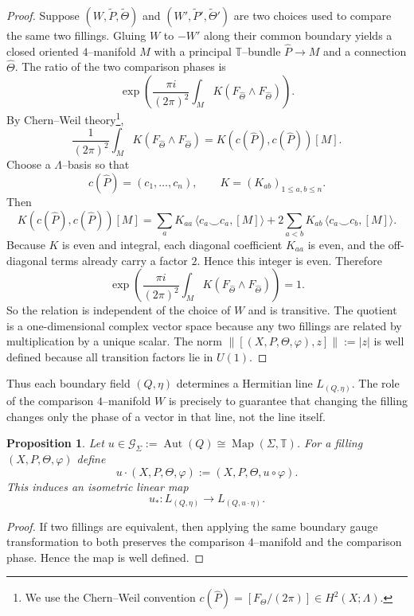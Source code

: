 \documentclass[12pt]{amsart}
\numberwithin{equation}{section}
\newtheorem{prop}[theorem]{Proposition}
\DeclareMathOperator{\Aut}{Aut}
\DeclareMathOperator{\Map}{Map}
\begin{document}
\begin{proof}
Suppose $(W,\widetilde P,\widetilde\Theta)$ and $(W',\widetilde P',\widetilde\Theta')$
are two choices used to compare the same two fillings.
Gluing $W$ to $-W'$ along their common boundary yields a closed oriented
$4$--manifold $M$ with a principal $\mathbb T$--bundle $\widehat P\to M$ and a
connection $\widehat\Theta$.
The ratio of the two comparison phases is
\[
\exp\!\left(
\frac{\pi i}{(2\pi)^2}
\int_M K(F_{\widehat\Theta}\wedge F_{\widehat\Theta})
\right).
\]
By Chern--Weil theory\footnote{We use the Chern--Weil convention \(c(\widehat P)=[F_\Theta/(2\pi)]\in H^2(X;\Lambda)\).},
\[
\frac{1}{(2\pi)^2}
\int_M K(F_{\widehat\Theta}\wedge F_{\widehat\Theta})
=
K(c(\widehat P),c(\widehat P))[M].
\]
Choose a $\Lambda$--basis so that
\[
c(\widehat P)=(c_1,\dots,c_n),\qquad K=(K_{ab})_{1\le a,b\le n}.
\]
Then
\[
K(c(\widehat P),c(\widehat P))[M]
=
\sum_a K_{aa}\,\langle c_a\smile c_a,[M]\rangle
+
2\sum_{a<b}K_{ab}\,\langle c_a\smile c_b,[M]\rangle.
\]
Because $K$ is even and integral, each diagonal coefficient $K_{aa}$ is even,
and the off-diagonal terms already carry a factor $2$. Hence this integer is even.
Therefore
\[
\exp\!\left(
\frac{\pi i}{(2\pi)^2}
\int_M K(F_{\widehat\Theta}\wedge F_{\widehat\Theta})
\right)=1.
\]
So the relation is independent of the choice of $W$ and is transitive. The quotient is a one-dimensional complex vector space because any two fillings
are related by multiplication by a unique scalar.
The norm $\bigl\|[(X,P,\Theta,\varphi),z]\bigr\|:=|z|$ is well defined because all transition factors lie in $U(1)$.
\end{proof}

Thus each boundary field \((Q,\eta)\) determines a Hermitian line \(L_{(Q,\eta)}\). The role of the comparison \(4\)--manifold \(W\) is precisely to guarantee that changing the filling changes only the phase of a vector in
that line, not the line itself.

\begin{prop}
\label{prop:gauge-action-boundary-line}
Let $u\in\mathcal G_\Sigma:=\Aut(Q)\cong \Map(\Sigma,\mathbb T)$.
For a filling $(X,P,\Theta,\varphi)$ define
\[
u\cdot (X,P,\Theta,\varphi):=(X,P,\Theta,u\circ\varphi).
\]
This induces an isometric linear map
\[
u_*:L_{(Q,\eta)}\longrightarrow L_{(Q,u\cdot \eta)}.
\]
\end{prop}

\begin{proof}
If two fillings are equivalent, then applying the same boundary gauge
transformation to both preserves the comparison $4$--manifold and the
comparison phase. Hence the map is well defined.
\end{proof}
\end{document}
